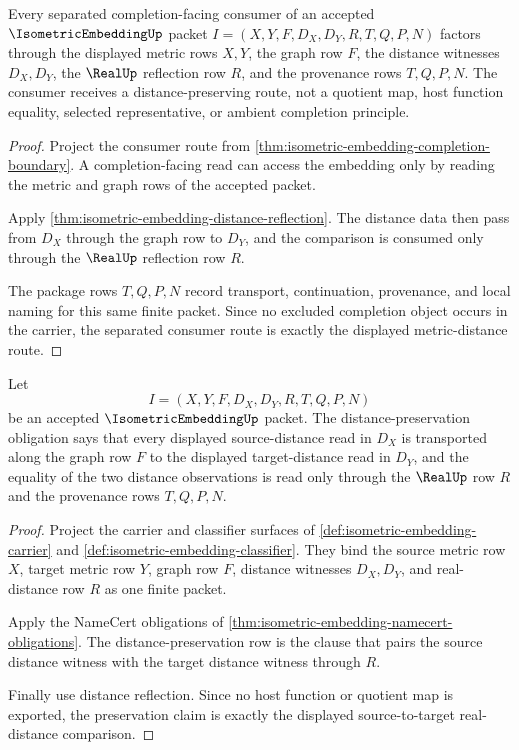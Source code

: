 \begin{theorem}
\label{thm:isometric-embedding-separated-consumer-route}
Every separated completion-facing consumer of an accepted $\IsometricEmbeddingUp$ packet $I=(X,Y,F,D_X,D_Y,R,T,Q,P,N)$ factors through the displayed metric rows $X,Y$, the graph row $F$, the distance witnesses $D_X,D_Y$, the $\RealUp$ reflection row $R$, and the provenance rows $T,Q,P,N$. The consumer receives a distance-preserving route, not a quotient map, host function equality, selected representative, or ambient completion principle.
\end{theorem}
\begin{proof}
Project the consumer route from \autoref{thm:isometric-embedding-completion-boundary}. A completion-facing read can access the embedding only by reading the metric and graph rows of the accepted packet.

Apply \autoref{thm:isometric-embedding-distance-reflection}. The distance data then pass from $D_X$ through the graph row to $D_Y$, and the comparison is consumed only through the $\RealUp$ reflection row $R$.

The package rows $T,Q,P,N$ record transport, continuation, provenance, and local naming for this same finite packet. Since no excluded completion object occurs in the carrier, the separated consumer route is exactly the displayed metric-distance route.
\end{proof}

\begin{theorem}
\label{thm:isometric-embedding-distance-preservation-obligation}
Let
$$
I=(X,Y,F,D_X,D_Y,R,T,Q,P,N)
$$
be an accepted $\IsometricEmbeddingUp$ packet. The distance-preservation obligation says that every displayed source-distance read in $D_X$ is transported along the graph row $F$ to the displayed target-distance read in $D_Y$, and the equality of the two distance observations is read only through the $\RealUp$ row $R$ and the provenance rows $T,Q,P,N$.
\end{theorem}
\begin{proof}
Project the carrier and classifier surfaces of \autoref{def:isometric-embedding-carrier} and \autoref{def:isometric-embedding-classifier}. They bind the source metric row $X$, target metric row $Y$, graph row $F$, distance witnesses $D_X,D_Y$, and real-distance row $R$ as one finite packet.

Apply the NameCert obligations of \autoref{thm:isometric-embedding-namecert-obligations}. The distance-preservation row is the clause that pairs the source distance witness with the target distance witness through $R$.

Finally use distance reflection. Since no host function or quotient map is exported, the preservation claim is exactly the displayed source-to-target real-distance comparison.
\end{proof}

